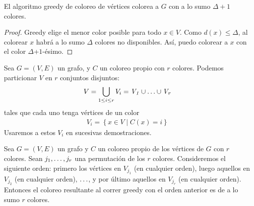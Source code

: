 \begin{proposition}
El algoritmo greedy de coloreo de vértices colorea a $G$ con a lo sumo $\Delta + 1$ colores.
\end{proposition}

\begin{proof}
Greedy elige el menor color posible para todo $x\in V$.
Como $d(x) \le \Delta$, al colorear $x$ habrá  a lo sumo $\Delta$ colores no disponibles. Así, puedo colorear a $x$ con el color $\Delta$+$1$-ésimo.
\end{proof}

\begin{definition}
Sea $G = (V, E)$ un grafo, y  $C$ un coloreo propio con $r$ colores. Podemos particionar $V$ en $r$ conjuntos disjuntos:
\begin{align}
    V = \bigcup_{1\le i \le r} V_i = \mathit{V_1} \cup \mathellipsis \cup \mathit{V_r}
\end{align}  
tales que cada uno tenga vértices de un color
\begin{align}
    \mathit{V_i} = \left\{x \in V \mid C(x) = i\right\}
\end{align}
Usaremos a estos $V_i$ en sucesivas demostraciones.
\end{definition}

\begin{theorem}
Sea $G = (V, E)$ un grafo y $C$ un coloreo propio de los vértices de $G$ con $r$ colores. Sean $j_1, \mathellipsis, j_r$ una permutación de los $r$ colores. Consideremos el siguiente orden: primero los vértices en $V_{j_1}$ (en cualquier orden), luego aquellos en $V_{j_2}$ (en cualquier orden), $\mathellipsis$, y por último aquellos en $V_{j_r}$ (en cualquier orden). Entonces el coloreo resultante al correr greedy con el orden anterior es de a lo sumo $r$ colores.
\end{theorem}

